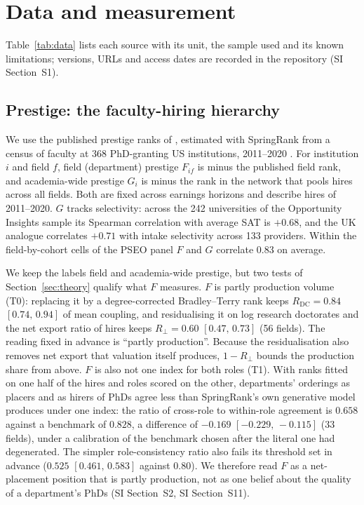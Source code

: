 \documentclass[11pt]{article}
\newcommand{\SI}[1]{SI Section~S#1}
\newcommand{\SItheory}{\SI{11}}
\newcommand{\ci}[2]{$[#1,\allowbreak\,#2]$}
\begin{document}
\section{Data and measurement}\label{sec:data}

Table~\ref{tab:data} lists each source with its unit, the sample used and its known limitations; versions, URLs
and access dates are recorded in the repository (\SI{1}).

\subsection{Prestige: the faculty-hiring hierarchy}\label{sec:prestige}

We use the published prestige ranks of \citet{wapman2022quantifying}, estimated with SpringRank from a census of
faculty at 368 PhD-granting US institutions, 2011--2020 \citep{wapman2022data}. For institution $i$ and field
$f$, field (department) prestige $F_{if}$ is minus the published field rank, and academia-wide prestige $G_i$ is
minus the rank in the network that pools hires across all fields. Both are fixed across earnings horizons and
describe hires of 2011--2020. $G$ tracks selectivity: across the 242 universities of the Opportunity Insights
sample its Spearman correlation with average SAT is $+0.68$, and the UK analogue correlates $+0.71$ with intake
selectivity across 133 providers. Within the field-by-cohort cells of the PSEO panel $F$ and $G$ correlate 0.83 on
average.

We keep the labels field and academia-wide prestige, but two tests of Section~\ref{sec:theory} qualify what $F$
measures. $F$ is partly production volume (T0): replacing it by a degree-corrected Bradley--Terry rank keeps
$R_{\mathrm{DC}}=0.84$ \ci{0.74}{0.94} of mean coupling, and residualising it on log research doctorates and the net export ratio of hires keeps $R_{\perp}=0.60$ \ci{0.47}{0.73} (56 fields). The reading fixed in advance is ``partly production''.
Because the residualisation also removes net export that valuation itself produces, $1-R_{\perp}$ bounds the
production share from above. $F$ is also not one index for both roles (T1). With ranks fitted on one half of the
hires and roles scored on the other, departments' orderings as placers and as hirers of PhDs agree less than
SpringRank's own generative model produces under one index: the ratio of cross-role to within-role agreement is
$0.658$ against a benchmark of $0.828$, a difference of $-0.169$ \ci{-0.229}{-0.115} (33 fields), under a
calibration of the benchmark chosen after the literal one had degenerated. The simpler role-consistency ratio also
fails its threshold set in advance ($0.525$ \ci{0.461}{0.583} against 0.80). We therefore read $F$ as a
net-placement position that is partly production, not as one belief about the quality of a department's PhDs
(\SI{2}, \SItheory).
\end{document}
